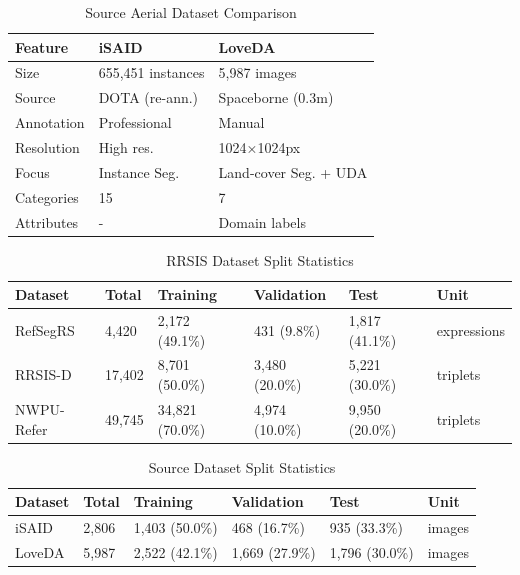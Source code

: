 \begin{table}[htbp]
\centering
\caption{Source Aerial Dataset Comparison}
\label{tab:source_comparison}
\begin{tabular}{@{}lll@{}}
\toprule
\textbf{Feature} & \textbf{iSAID} & \textbf{LoveDA} \\
\midrule
Size & 655,451 instances & 5,987 images \\
Source & DOTA (re-ann.) & Spaceborne (0.3m) \\
Annotation & Professional & Manual \\
Resolution & High res. & 1024×1024px \\
Focus & Instance Seg. & Land-cover Seg. + UDA \\
Categories & 15 & 7 \\
Attributes & - & Domain labels \\
\bottomrule
\end{tabular}
\end{table}

\begin{table}[htbp]
\centering
\caption{RRSIS Dataset Split Statistics}
\label{tab:rrsis_splits}
\begin{tabular}{@{}llllll@{}}
\toprule
\textbf{Dataset} & \textbf{Total} & \textbf{Training} & \textbf{Validation} & \textbf{Test} & \textbf{Unit} \\
\midrule
RefSegRS & 4,420 & 2,172 (49.1\%) & 431 (9.8\%) & 1,817 (41.1\%) & expressions \\
RRSIS-D & 17,402 & 8,701 (50.0\%) & 3,480 (20.0\%) & 5,221 (30.0\%) & triplets \\
NWPU-Refer & 49,745 & 34,821 (70.0\%) & 4,974 (10.0\%) & 9,950 (20.0\%) & triplets \\
\bottomrule
\end{tabular}
\end{table}

\begin{table}[htbp]
\centering
\caption{Source Dataset Split Statistics}
\label{tab:source_splits}
\begin{tabular}{@{}llllll@{}}
\toprule
\textbf{Dataset} & \textbf{Total} & \textbf{Training} & \textbf{Validation} & \textbf{Test} & \textbf{Unit} \\
\midrule
iSAID & 2,806 & 1,403 (50.0\%) & 468 (16.7\%) & 935 (33.3\%) & images \\
LoveDA & 5,987 & 2,522 (42.1\%) & 1,669 (27.9\%) & 1,796 (30.0\%) & images \\
\bottomrule
\end{tabular}
\end{table}

